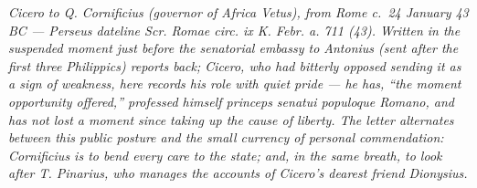 
\textit{Cicero to Q. Cornificius (governor of Africa Vetus), from Rome c.\ 24 January 43 BC ---
Perseus dateline \textit{Scr. Romae circ. ix K. Febr. a. 711 (43)}. Written in the suspended moment just before the senatorial embassy to Antonius (sent after the first three Philippics) reports back; Cicero, who had bitterly opposed sending it as a sign of weakness, here records his role with quiet pride --- he has, ``the moment opportunity offered,'' professed himself \textit{princeps senatui populoque Romano}, and has not lost a moment since taking up the cause of liberty. The letter alternates between this public posture and the small currency of personal commendation: Cornificius is to bend every care to the state; and, in the same breath, to look after T. Pinarius, who manages the accounts of Cicero's dearest friend Dionysius.}
